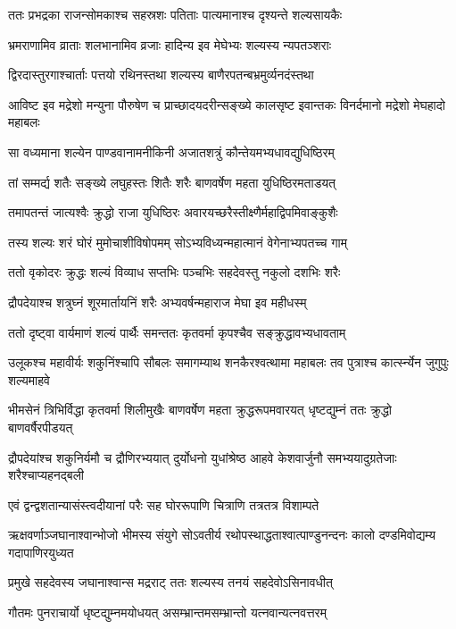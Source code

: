 \twolineshloka
{ततः प्रभद्रका राजन्सोमकाश्च सहस्रशः}
{पतिताः पात्यमानाश्च दृश्यन्ते शल्यसायकैः}


\twolineshloka
{भ्रमराणामिव व्राताः शलभानामिव व्रजाः}
{हादिन्य इव मेघेभ्यः शल्यस्य न्यपतञ्शराः}


\twolineshloka
{द्विरदास्तुरगाश्चार्ताः पत्तयो रथिनस्तथा}
{शल्यस्य बाणैरपतन्बभ्रमुर्व्यनदंस्तथा}


\threelineshloka
{आविष्ट इव मद्रेशो मन्युना पौरुषेण च}
{प्राच्छादयदरीन्सङ्ख्ये कालसृष्ट इवान्तकः}
{विनर्दमानो मद्रेशो मेघहादो महाबलः}


\twolineshloka
{सा वध्यमाना शल्येन पाण्डवानामनीकिनी}
{अजातशत्रुं कौन्तेयमभ्यधावद्युधिष्ठिरम्}


\twolineshloka
{तां सम्मर्द्य शतैः सङ्ख्ये लघुहस्तः शितैः शरैः}
{बाणवर्षेण महता युधिष्ठिरमताडयत्}


\twolineshloka
{तमापतन्तं जात्यश्वैः क्रुद्धो राजा युधिष्ठिरः}
{अवारयच्छरैस्तीक्ष्णैर्महाद्विपमिवाङ्कुशैः}


\twolineshloka
{तस्य शल्यः शरं घोरं मुमोचाशीविषोपमम्}
{सोऽभ्यविध्यन्महात्मानं वेगेनाभ्यपतच्च गाम्}


\twolineshloka
{ततो वृकोदरः क्रुद्धः शल्यं विव्याध सप्तभिः}
{पञ्चभिः सहदेवस्तु नकुलो दशभिः शरैः}


\twolineshloka
{द्रौपदेयाश्च शत्रुघ्नं शूरमार्तायनिं शरैः}
{अभ्यवर्षन्महाराज मेघा इव महीधस्म्}


\twolineshloka
{ततो दृष्ट्वा वार्यमाणं शल्यं पार्थैः समन्ततः}
{कृतवर्मा कृपश्चैव सङ्क्रुद्धावभ्यधावताम्}


\threelineshloka
{उलूकश्च महावीर्यः शकुनिंश्चापि सौबलः}
{समागम्याथ शनकैरश्वत्थामा महाबलः}
{तव पुत्राश्च कार्त्स्न्येन जुगुपुः शल्यमाहवे}


\threelineshloka
{भीमसेनं त्रिभिर्विद्धा कृतवर्मा शिलीमुखैः}
{बाणवर्षेण महता क्रुद्धरूपमवारयत्}
{धृष्टद्युम्नं ततः क्रुद्धो बाणवर्षैरपीडयत्}


द्रौपदेयांश्च शकुनिर्यमौ च द्रौणिरभ्ययात्
\twolineshloka
{दुर्योधनो युधांश्रेष्ठ आहवे केशवार्जुनौ}
{समभ्ययादुग्रतेजाः शरैश्चाप्यहनद्बली}


\twolineshloka
{एवं द्वन्द्वशतान्यासंस्त्वदीयानां परैः सह}
{घोररूपाणि चित्राणि तत्रतत्र विशाम्पते}


\threelineshloka
{ऋक्षवर्णाञ्जघानाश्वान्भोजो भीमस्य संयुगे}
{सोऽवतीर्य रथोपस्थाद्धताश्वात्पाण्डुनन्दनः}
{कालो दण्डमिवोद्यम्य गदापाणिरयुध्यत}


\twolineshloka
{प्रमुखे सहदेवस्य जघानाश्वान्स मद्रराट्}
{ततः शल्यस्य तनयं सहदेवोऽसिनावधीत्}


\twolineshloka
{गौतमः पुनराचार्यो धृष्टद्युम्नमयोधयत्}
{असम्भ्रान्तमसम्भ्रान्तो यत्नवान्यत्नवत्तरम्}



